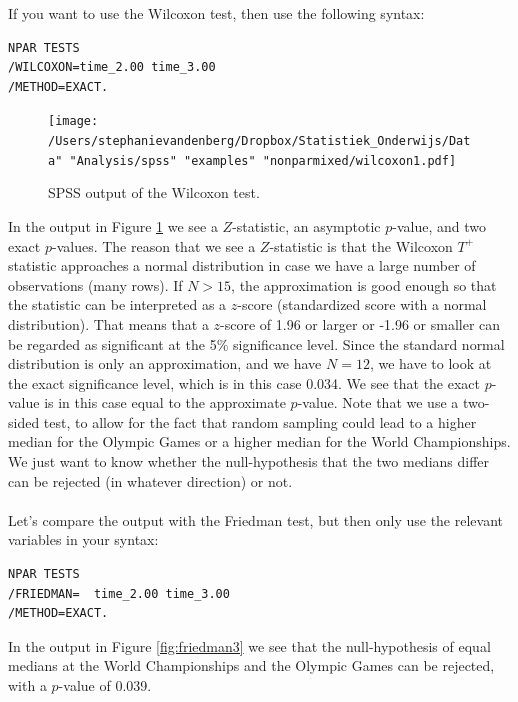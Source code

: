 \documentclass[]{book}\usepackage[]{graphicx}\usepackage[]{color}
\begin{document}
If you want to use the Wilcoxon test, then use the following syntax:

\begin{verbatim}
NPAR TESTS
/WILCOXON=time_2.00 time_3.00
/METHOD=EXACT.
\end{verbatim}


\begin{figure}[h]
    \begin{center}
       \texttt{[image: /Users/stephanievandenberg/Dropbox/Statistiek\_Onderwijs/Data" "Analysis/spss" "examples" "nonparmixed/wilcoxon1.pdf]}
    \end{center}
    \caption{SPSS output of the Wilcoxon test.}
    \label{fig:wilcoxon1}
\end{figure}

In the output in Figure \ref{fig:wilcoxon1} we see a $Z$-statistic, an asymptotic $p$-value, and two exact $p$-values. The reason that we see a $Z$-statistic is that the Wilcoxon $T^+$ statistic approaches a normal distribution in case we have a large number of observations (many rows). If $N>15$, the approximation is good enough so that the statistic can be interpreted as a $z$-score (standardized score with a normal distribution). That means that a $z$-score of 1.96 or larger or -1.96 or smaller can be regarded as significant at the 5\% significance level. Since the standard normal distribution is only an approximation, and we have $N=12$, we have to look at the exact significance level, which is in this case 0.034. We see that the exact $p$-value is in this case equal to the approximate $p$-value. Note that we use a two-sided test, to allow for the fact that random sampling could lead to a higher median for the Olympic Games or a higher median for the World Championships. We just want to know whether the null-hypothesis that the two medians differ can be rejected (in whatever direction) or not.
\\
\\


Let's compare the output with the Friedman test, but then only use the relevant variables in your syntax:

\begin{verbatim}
NPAR TESTS
/FRIEDMAN=  time_2.00 time_3.00
/METHOD=EXACT.
\end{verbatim}


In the output in Figure \ref{fig:friedman3} we see that the null-hypothesis of equal medians at the World Championships and the Olympic Games can be rejected, with a $p$-value of 0.039.
\end{document}
